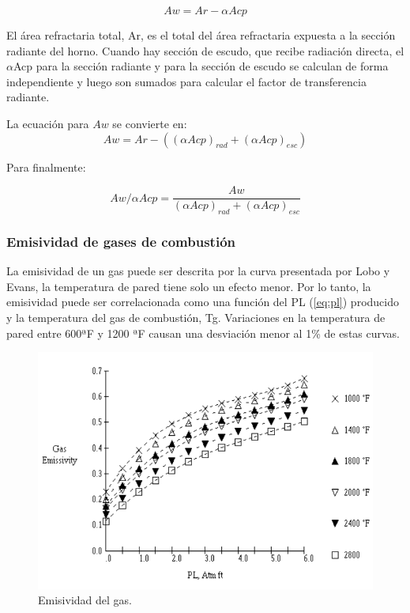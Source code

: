 \begin{equation}
Aw = Ar - \alpha Acp
\end{equation}

\par El área refractaria total, Ar, es el total del área refractaria expuesta a la sección radiante del horno. Cuando hay sección de escudo, que recibe radiación directa, el $\alpha$Acp para la sección radiante y para la sección de escudo se calculan de forma independiente y luego son sumados para calcular el factor de transferencia radiante.

\par La ecuación para $Aw$ se convierte en:
\begin{equation}
Aw = Ar - ((\alpha Acp)_{rad} + (\alpha Acp)_{esc})   
\end{equation}

\par Para finalmente:

\begin{equation}
\label{eq:aw-acp}
Aw/\alpha Acp = \frac{Aw}{(\alpha Acp)_{rad} + (\alpha Acp)_{esc}}
\end{equation}
 
\subsubsection{Emisividad de gases de combustión}
\par La emisividad de un gas puede ser descrita por la curva presentada por Lobo y Evans\cite{bib:rad}, la temperatura de pared tiene solo un efecto menor. Por lo tanto, la emisividad puede ser correlacionada como una función del PL (\ref{eq:pl}) producido y la temperatura del gas de combustión, Tg. Variaciones en la temperatura de pared entre 600ªF y 1200 ªF causan una desviación menor al 1\% de estas curvas.

\begin{figure}[hbt]
\begin{center}
\includegraphics[scale=0.45]{images/emiss}
\caption[Emisividad del gas]{Emisividad del gas.}
\label{fig:emiss}
\end{center}
\end{figure}

